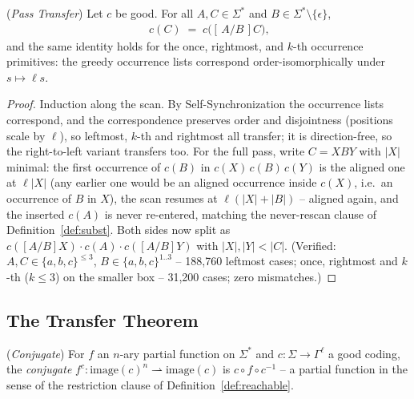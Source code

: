 \begin{lemma}
    (\emph{Pass Transfer})
    \label{lem:pass-transfer}
    Let $c$ be good. For all $A, C \in \Sigma^*$ and $B \in \Sigma^*
    \setminus \{\epsilon\}$,
    \begin{align}
        [\,c(A)/c(B)\,]\; c(C) \;=\; c\big([\,A/B\,]C\big),
    \end{align}
    and the same identity holds for the once, rightmost, and $k$-th
    occurrence primitives: the greedy occurrence lists correspond
    order-isomorphically under $s \mapsto \ell s$.
\end{lemma}

\begin{proof}
    Induction along the scan. By Self-Synchronization the occurrence lists
    correspond, and the correspondence preserves order and disjointness
    (positions scale by $\ell$), so leftmost, $k$-th and rightmost all
    transfer; it is direction-free, so the right-to-left variant transfers
    too. For the full pass, write $C = X B Y$ with $|X|$ minimal: the first
    occurrence of $c(B)$ in $c(X)\,c(B)\,c(Y)$ is the aligned one at
    $\ell|X|$ (any earlier one would be an aligned occurrence inside
    $c(X)$, i.e.\ an occurrence of $B$ in $X$), the scan resumes at
    $\ell(|X|{+}|B|)$ -- aligned again, and the inserted $c(A)$ is never
    re-entered, matching the never-rescan clause of Definition~\ref{def:subst}.
    Both sides now split as $c([A/B]X) \cdot c(A) \cdot c([A/B]Y)$ with
    $|X|, |Y| < |C|$. (Verified: $A, C \in \{a,b,c\}^{\le 3}$, $B \in
    \{a,b,c\}^{1..3}$ -- 188,760 leftmost cases; once, rightmost and
    $k$-th ($k \le 3$) on the smaller box -- 31,200 cases; zero mismatches.)
\end{proof}

\subsection{The Transfer Theorem}

\begin{definition}
    (\emph{Conjugate})
    \label{def:conjugate}
    For $f$ an $n$-ary partial function on $\Sigma^*$ and $c : \Sigma
    \rightarrow \Gamma^\ell$ a good coding, the \emph{conjugate}
    $f^c : \mathrm{image}(c)^n \rightharpoonup \mathrm{image}(c)$ is
    $c \circ f \circ c^{-1}$ -- a partial function in the sense of the
    restriction clause of Definition~\ref{def:reachable}.
\end{definition}

